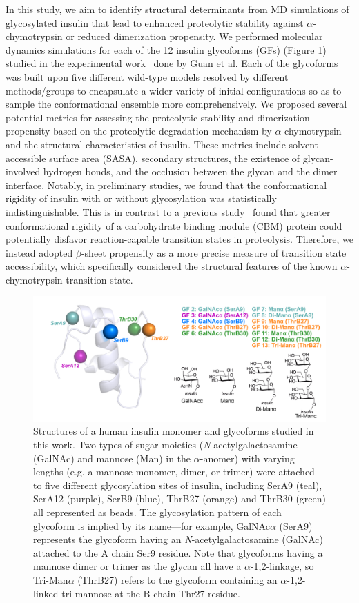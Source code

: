 \documentclass[sn-vancouver]{sn-jnl}
\begin{document}
In this study, we aim to identify structural determinants from MD simulations of glycosylated insulin that lead to enhanced proteolytic stability against $\alpha$-chymotrypsin or reduced dimerization propensity. We performed molecular dynamics simulations for each of the 12 insulin glycoforms (GFs) (Figure \ref{sys_of_interest}) studied in the experimental work~\cite{guan2018chemically} done by Guan et al. Each of the glycoforms was built upon five different wild-type models resolved by different methods/groups to encapsulate a wider variety of initial configurations so as to sample the conformational ensemble more comprehensively. We proposed several potential metrics for assessing the proteolytic stability and dimerization propensity based on the proteolytic degradation mechanism by $\alpha$-chymotrypsin~\cite{schilling1991degradation} and the structural characteristics of insulin. These metrics include solvent-accessible surface area (SASA), secondary structures, the existence of glycan-involved hydrogen bonds, and the occlusion between the glycan and the dimer interface. Notably, in  preliminary studies, we found that the conformational rigidity of insulin with or without glycosylation was statistically indistinguishable. This is in contrast to a previous study~\cite{chaffey2017structural} found that greater conformational rigidity of a carbohydrate binding module (CBM) protein could potentially disfavor reaction-capable transition states in proteolysis. Therefore, we instead adopted $\beta$-sheet propensity as a more precise measure of transition state accessibility, which specifically considered the structural features of the known $\alpha$-chymotrypsin transition state.
\begin{figure}[H]
\centering
\includegraphics[width=\textwidth]{Figures/Fig_glycan_positions.png}
\caption{Structures of a human insulin monomer and glycoforms studied in this work. Two types of sugar moieties (\emph{N}-acetylgalactosamine (GalNAc) and mannose (Man) in the $\alpha$-anomer) with varying lengths (e.g. a mannose monomer, dimer, or trimer) were attached to five different glycosylation sites of insulin, including SerA9 (teal), SerA12 (purple), SerB9 (blue), ThrB27 (orange) and ThrB30 (green) all represented as beads. The glycosylation pattern of each glycoform is implied by its name---for example, GalNAc$\alpha$ (SerA9) represents the glycoform having an \emph{N}-acetylgalactosamine (GalNAc) attached to the A chain Ser9 residue. Note that glycoforms having a mannose dimer or trimer as the glycan all have a $\alpha$-1,2-linkage, so Tri-Man$\alpha$ (ThrB27) refers to the glycoform containing an $\alpha$-1,2-linked tri-mannose at the B chain Thr27 residue.}
\label{sys_of_interest}
\end{figure}
\end{document}
